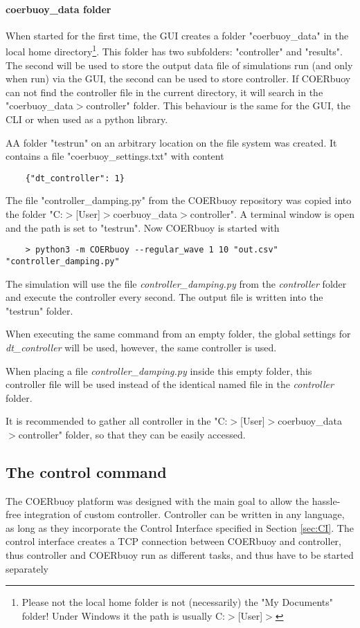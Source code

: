 \documentclass[oneside,10pt,a4paper]{book}
\begin{document}
\paragraph{coerbuoy\_data folder}
When started for the first time, the GUI creates a folder "coerbuoy\_data" in the local home directory\footnote{Please not the local home folder is not (necessarily) the "My Documents" folder! Under Windows it the path is usually C:$>$[User]$>$}. This folder has two subfolders: "controller" and "results". The second will be used to store the output data file of simulations run (and only when run) via the GUI, the second can be used to store controller. If COERbuoy can not find the controller file in the current directory, it will search in the "coerbuoy\_data$>$controller" folder. This behaviour is the same for the GUI, the CLI or when used as a python library.
\begin{example}
AA folder "testrun" on an arbitrary location on the file system was created. It contains a file "coerbuoy\_settings.txt" with content
\begin{verbatim}
	{"dt_controller": 1}
\end{verbatim}
The file "controller\_damping.py" from the COERbuoy repository was copied into the folder "C:$>$[User]$>$coerbuoy\_data$>$controller". A terminal window is open and the path is set to "testrun". Now COERbuoy is started with
\begin{verbatim}
	> python3 -m COERbuoy --regular_wave 1 10 "out.csv" "controller_damping.py"
\end{verbatim}
The simulation will use the file \textit{controller\_damping.py} from the \textit{controller} folder and execute the controller every second. The output file is written into the "testrun" folder.

When executing the same command from an empty folder, the global settings for \textit{dt\_controller} will be used, however, the same controller is used.

When placing a file \textit{controller\_damping.py} inside this empty folder, this controller file will be used instead of the identical named file in the \textit{controller} folder.
\end{example}
It is recommended to gather all controller in the "C:$>$[User]$>$coerbuoy\_data$>$controller" folder, so that they can be easily accessed.
\subsection{The control command}
The COERbuoy platform was designed with the main goal to allow the hassle-free integration of custom controller. Controller can be written in any language, as long as they incorporate the Control Interface specified in Section \ref{sec:CI}. The control interface creates a TCP connection between COERbuoy and controller, thus controller and COERbuoy run as different tasks, and thus have to be started separately
\end{document}

